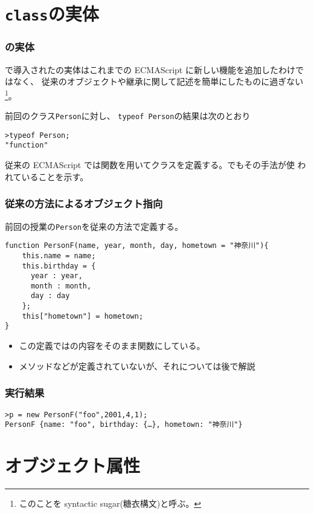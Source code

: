 \section{\protect\texttt{class}の実体}
\begin{frame}[containsverbatim]
\frametitle{の実体}
\ES で導入されたの実体はこれまでの
 ECMAScript に新しい機能を追加したわけではなく、
 従来のオブジェクトや継承に関して記述を簡単にしたものに過ぎない
 \footnote{このことを syntactic sugar(糖衣構文)と呼ぶ。}。
 
 前回のクラス\texttt{Person}に対し、
 \texttt{typeof Person}の結果は次のとおり
\begin{Verbatim}
>typeof Person;
"function"
\end{Verbatim}
従来の ECMAScript では関数を用いてクラスを定義する。でもその手法が使
われていることを示す。
\end{frame}
\begin{frame}[containsverbatim]
 \frametitle{従来の方法によるオブジェクト指向}
 前回の授業の\texttt{Person}を従来の方法で定義する。
 {\small
\begin{Verbatim}
function PersonF(name, year, month, day, hometown = "神奈川"){
    this.name = name;
    this.birthday = {
      year : year,
      month : month,
      day : day
    };
    this["hometown"] = hometown;
}
\end{Verbatim}
 }
 \begin{itemize}
  \item この定義ではの内容をそのまま関数にしている。
  \item メソッドなどが定義されていないが、それについては後で解説
 \end{itemize}
\end{frame}
\begin{frame}[containsverbatim]
\frametitle{実行結果}
\begin{Verbatim}
>p = new PersonF("foo",2001,4,1);
PersonF {name: "foo", birthday: {…}, hometown: "神奈川"}
\end{Verbatim}
\end{frame}
\section{オブジェクト属性}
